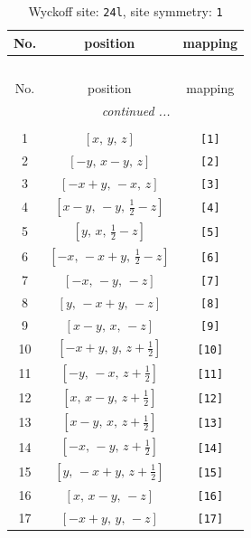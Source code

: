 \documentclass[fleqn,8pt]{jsarticle}
\begin{document}
\begin{longtable}{ccc}
\caption{Wyckoff site: {\tt 24l}, site symmetry: {\tt 1}}
 \\
 \hline \hline
No. & position & mapping \\ \hline \endfirsthead

\multicolumn{2}{l}{\tablename\ \thetable{}} \\
 \hline \hline
No. & position & mapping \\ \hline \endhead

 \hline \hline
\multicolumn{2}{r}{\footnotesize\it continued ...} \\ \endfoot

 \hline \hline
\multicolumn{2}{r}{} \\ \endlastfoot

1 & $\left[ x,\, y,\, z \right]$ & {\tt [1]} \\ \hline
2 & $\left[ - y,\, x - y,\, z \right]$ & {\tt [2]} \\ \hline
3 & $\left[ - x + y,\, - x,\, z \right]$ & {\tt [3]} \\ \hline
4 & $\left[ x - y,\, - y,\, \frac{1}{2} - z \right]$ & {\tt [4]} \\ \hline
5 & $\left[ y,\, x,\, \frac{1}{2} - z \right]$ & {\tt [5]} \\ \hline
6 & $\left[ - x,\, - x + y,\, \frac{1}{2} - z \right]$ & {\tt [6]} \\ \hline
7 & $\left[ - x,\, - y,\, - z \right]$ & {\tt [7]} \\ \hline
8 & $\left[ y,\, - x + y,\, - z \right]$ & {\tt [8]} \\ \hline
9 & $\left[ x - y,\, x,\, - z \right]$ & {\tt [9]} \\ \hline
10 & $\left[ - x + y,\, y,\, z + \frac{1}{2} \right]$ & {\tt [10]} \\ \hline
11 & $\left[ - y,\, - x,\, z + \frac{1}{2} \right]$ & {\tt [11]} \\ \hline
12 & $\left[ x,\, x - y,\, z + \frac{1}{2} \right]$ & {\tt [12]} \\ \hline
13 & $\left[ x - y,\, x,\, z + \frac{1}{2} \right]$ & {\tt [13]} \\ \hline
14 & $\left[ - x,\, - y,\, z + \frac{1}{2} \right]$ & {\tt [14]} \\ \hline
15 & $\left[ y,\, - x + y,\, z + \frac{1}{2} \right]$ & {\tt [15]} \\ \hline
16 & $\left[ x,\, x - y,\, - z \right]$ & {\tt [16]} \\ \hline
17 & $\left[ - x + y,\, y,\, - z \right]$ & {\tt [17]} \\ \hline

\end{longtable}
\end{document}
